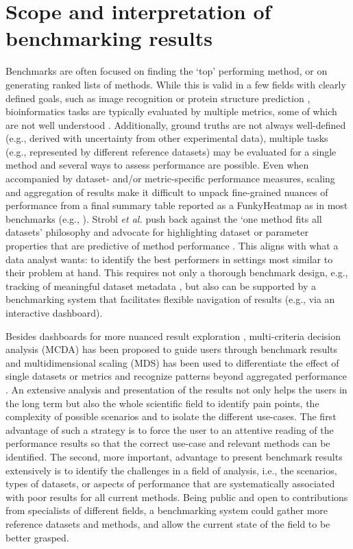 \documentclass[11pt]{article}
\begin{document}
\section*{Scope and interpretation of benchmarking results}

Benchmarks are often focused on finding the `top' performing method, or on generating ranked lists of methods. While this is valid in a few fields with clearly defined goals, such as image recognition \cite{Khan2018-ot} or protein structure prediction \cite{Jumper2021-oq}, bioinformatics tasks are typically evaluated by multiple metrics, some of which are not well understood \cite{Lutge2021-mt, Reinke2024-dw}. Additionally, ground truths are not always well-defined (e.g., derived with uncertainty from other experimental data), multiple tasks (e.g., represented by different reference datasets) may be evaluated for a single method and several ways to assess performance are possible. Even when accompanied by dataset- and/or metric-specific performance measures, scaling and aggregation of results make it difficult to unpack fine-grained nuances of performance from a final summary table reported as a FunkyHeatmap \cite{funkyheatmap} as in most benchmarks (e.g., \cite{Saelens2019-jy}). Strobl \textit{et al.} push back against the `one method fits all datasets’ philosophy and advocate for highlighting dataset or parameter properties that are predictive of method performance \cite{Jelizarow2010-kr, Boulesteix2010-zj, Strobl2024-lp}. This aligns with what a data analyst wants: to identify the best performers in settings most similar to their problem at hand. This requires not only a thorough benchmark design, e.g., tracking of meaningful dataset metadata \cite{Strobl2024-lp}, but also can be supported by a benchmarking system that facilitates flexible navigation of results (e.g., via an interactive dashboard). 

Besides dashboards for more nuanced result exploration \cite{bettr}, multi-criteria decision analysis (MCDA) \cite{Taherdoost2023-wd} has been proposed to guide users through benchmark results and multidimensional scaling (MDS) has been used to differentiate the effect of single datasets or metrics and recognize patterns beyond aggregated performance \cite{Niessl2022-fk}. An extensive analysis and presentation of the results not only helps the users in the long term but also the whole scientific field to identify pain points, the complexity of possible scenarios and to isolate the different use-cases. The first advantage of such a strategy is to force the user to an attentive reading of the performance results so that the correct use-case and relevant methods can be identified. The second, more important, advantage to present benchmark results extensively is to identify the challenges in a field of analysis, i.e., the scenarios, types of datasets, or aspects of performance that are systematically associated with poor results for all current methods. Being public and open to contributions from specialists of different fields, a benchmarking system could gather more reference datasets and methods, and allow the current state of the field to be better grasped. 
\end{document}
